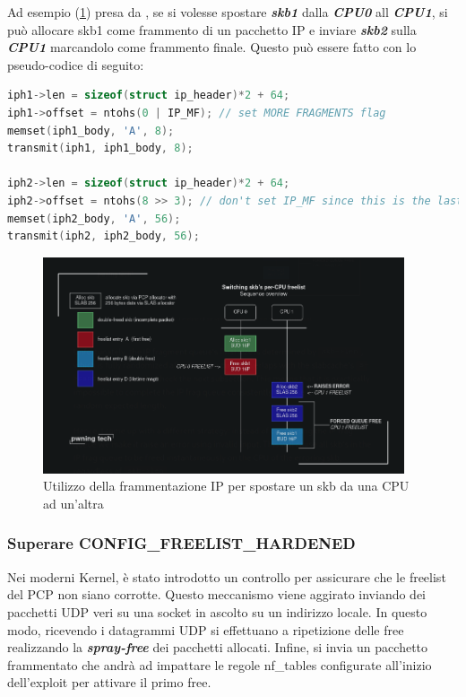 \documentclass{article}
\begin{document}
Ad esempio (\cref{fig:skb-migr}) presa da \cite{NetfilterTablesVulnerability}, se si volesse spostare \textbf{\textit{skb1}} dalla \textbf{\textit{CPU0}} all 
\textbf{\textit{CPU1}}, si può allocare skb1 come frammento di un pacchetto IP e inviare 
\textbf{\textit{skb2}} sulla \textbf{\textit{CPU1}} marcandolo come frammento finale. 
Questo può essere fatto con lo pseudo-codice di seguito:

\begin{lstlisting}[language=C,style=CStyle,caption="Creazione di due frammenti per un pacchetto IP"]
iph1->len = sizeof(struct ip_header)*2 + 64;
iph1->offset = ntohs(0 | IP_MF); // set MORE FRAGMENTS flag 
memset(iph1_body, 'A', 8); 
transmit(iph1, iph1_body, 8); 

iph2->len = sizeof(struct ip_header)*2 + 64; 
iph2->offset = ntohs(8 >> 3); // don't set IP_MF since this is the last packet 
memset(iph2_body, 'A', 56); 
transmit(iph2, iph2_body, 56);
\end{lstlisting}


\begin{figure}[h]
  \begin{center}
    \includegraphics[width=0.95\textwidth]{figures/ch1/switching_skb_cpu-1.png}
  \end{center}
  \caption{Utilizzo della frammentazione IP per spostare un skb da una CPU ad un'altra}\label{fig:skb-migr}
\end{figure}

\subsubsection{Superare CONFIG\_FREELIST\_HARDENED} Nei moderni Kernel, è stato introdotto 
un controllo per assicurare che le freelist del PCP non siano corrotte. Questo meccanismo 
viene aggirato inviando dei pacchetti UDP veri su una socket in ascolto su un indirizzo locale. 
In questo modo, ricevendo i datagrammi UDP si effettuano a ripetizione delle free realizzando 
la \textbf{\textit{spray-free}} dei pacchetti allocati. Infine, si invia un pacchetto frammentato 
che andrà ad impattare le regole nf\_tables configurate all'inizio dell'exploit per attivare 
il primo free.
\end{document}
